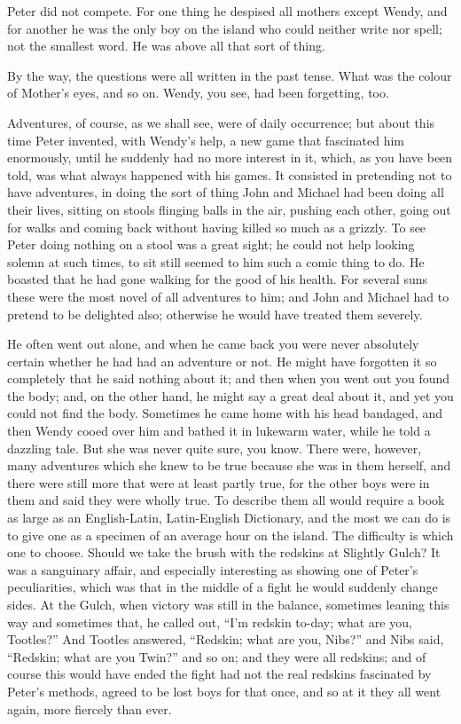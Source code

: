 Peter did not compete.
For one thing he despised all mothers except Wendy,
and for another he was the only boy on the island who could neither write nor spell;
not the smallest word.
He was above all that sort of thing.

By the way, the questions were all written in the past tense.
What was the colour of Mother’s eyes, and so on.
Wendy, you see, had been forgetting, too.

Adventures, of course, as we shall see, were of daily occurrence;
but about this time Peter invented, with Wendy’s help, a new game that fascinated him enormously,
until he suddenly had no more interest in it,
which, as you have been told, was what always happened with his games.
It consisted in pretending not to have adventures,
in doing the sort of thing John and Michael had been doing all their lives,
sitting on stools flinging balls in the air, pushing each other,
going out for walks and coming back without having killed so much as a grizzly.
To see Peter doing nothing on a stool was a great sight;
he could not help looking solemn at such times, to sit still seemed to him such a comic thing to do.
He boasted that he had gone walking for the good of his health.
For several suns these were the most novel of all adventures to him;
and John and Michael had to pretend to be delighted also;
otherwise he would have treated them severely.

He often went out alone,
and when he came back you were never absolutely certain whether he had had an adventure or not.
He might have forgotten it so completely that he said nothing about it;
and then when you went out you found the body;
and, on the other hand, he might say a great deal about it, and yet you could not find the body.
Sometimes he came home with his head bandaged,
and then Wendy cooed over him and bathed it in lukewarm water, while he told a dazzling tale.
But she was never quite sure, you know.
There were, however, many adventures which she knew to be true because she was in them herself,
and there were still more that were at least partly true,
for the other boys were in them and said they were wholly true.
To describe them all would require a book as large as an English-Latin, Latin-English Dictionary,
and the most we can do is to give one as a specimen of an average hour on the island.
The difficulty is which one to choose.
Should we take the brush with the redskins at Slightly Gulch?
It was a sanguinary affair,
and especially interesting as showing one of Peter’s peculiarities,
which was that in the middle of a fight he would suddenly change sides.
At the Gulch, when victory was still in the balance,
sometimes leaning this way and sometimes that, he called out, “I’m redskin to-day;
what are you, Tootles?”
And Tootles answered, “Redskin;
what are you, Nibs?\@” and Nibs said, “Redskin;
what are you Twin?\@” and so on;
and they were all redskins;
and of course this would have ended the fight
had not the real redskins fascinated by Peter’s methods,
agreed to be lost boys for that once, and so at it they all went again, more fiercely than ever.

